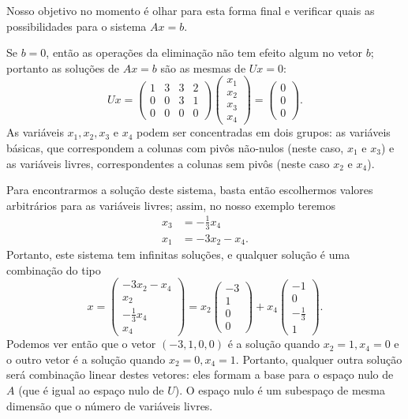 Nosso objetivo no momento é olhar para esta forma final e verificar quais as possibilidades para o sistema $Ax=b$.

Se $b=0$, então as operações da eliminação não tem efeito algum no vetor $b$; portanto as soluções de $Ax=b$ são as mesmas de $Ux=0$:
\begin{equation*}
  Ux =
    \begin{pmatrix}
      1 & 3 & 3 & 2\\
      0 & 0 & 3 & 1\\
      0 & 0 & 0 & 0 
    \end{pmatrix}
    \begin{pmatrix}
      x_1\\
      x_2\\
      x_3\\
      x_4
    \end{pmatrix}
    =
    \begin{pmatrix}
       0\\
       0\\
       0
    \end{pmatrix}.
\end{equation*}
As variáveis $x_1,x_2,x_3$ e $x_4$ podem ser concentradas em dois grupos: as variáveis básicas, que correspondem a colunas com pivôs não-nulos (neste caso, $x_1$ e $x_3$) e as variáveis livres, correspondentes a colunas sem pivôs (neste caso $x_2$ e $x_4$).

Para encontrarmos a solução deste sistema, basta então escolhermos valores arbitrários para as variáveis livres; assim, no nosso exemplo teremos
\begin{align*}
  x_3 &= -\frac{1}{3} x_4\\
  x_1 &= -3x_2 -x_4.
\end{align*}
Portanto, este sistema tem infinitas soluções, e qualquer solução é uma combinação do tipo
\begin{equation*}
  x =
    \begin{pmatrix}
      -3x_2-x_4\\
      x_2\\
      -\frac{1}{3}x_4\\
      x_4
    \end{pmatrix}
    = x_2
    \begin{pmatrix}
       -3\\
       1\\
       0\\
       0
    \end{pmatrix}
    + x_4 
    \begin{pmatrix}
      -1\\
      0\\
      -\frac{1}{3}\\
      1
    \end{pmatrix}.
\end{equation*}
Podemos ver então que o vetor $(-3,1,0,0)$ é a solução quando $x_2=1, x_4=0$ e o outro vetor é a solução quando $x_2=0,x_4=1$. Portanto, qualquer outra solução será combinação linear destes vetores: eles formam a base para o espaço nulo de $A$ (que é igual ao espaço nulo de $U$). O espaço nulo é um subespaço de mesma dimensão que o número de variáveis livres.

